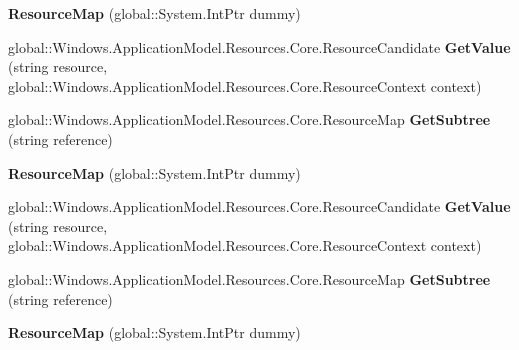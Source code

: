 \begin{DoxyCompactItemize}
{\bfseries Resource\+Map} (global\+::\+System.\+Int\+Ptr dummy)
\item 
\mbox{\label{class_windows_1_1_application_model_1_1_resources_1_1_core_1_1_resource_map_aef94042cd27f045f8035733034f6e2c4}} 
global\+::\+Windows.\+Application\+Model.\+Resources.\+Core.\+Resource\+Candidate {\bfseries Get\+Value} (string resource, global\+::\+Windows.\+Application\+Model.\+Resources.\+Core.\+Resource\+Context context)
\item 
\mbox{\label{class_windows_1_1_application_model_1_1_resources_1_1_core_1_1_resource_map_ac129a8e320a6dc314ec3767626950aa8}} 
global\+::\+Windows.\+Application\+Model.\+Resources.\+Core.\+Resource\+Map {\bfseries Get\+Subtree} (string reference)
\item 
\mbox{\label{class_windows_1_1_application_model_1_1_resources_1_1_core_1_1_resource_map_af0aec2b4469c89c900f7eed2f53504bf}} 
{\bfseries Resource\+Map} (global\+::\+System.\+Int\+Ptr dummy)
\item 
\mbox{\label{class_windows_1_1_application_model_1_1_resources_1_1_core_1_1_resource_map_aef94042cd27f045f8035733034f6e2c4}} 
global\+::\+Windows.\+Application\+Model.\+Resources.\+Core.\+Resource\+Candidate {\bfseries Get\+Value} (string resource, global\+::\+Windows.\+Application\+Model.\+Resources.\+Core.\+Resource\+Context context)
\item 
\mbox{\label{class_windows_1_1_application_model_1_1_resources_1_1_core_1_1_resource_map_ac129a8e320a6dc314ec3767626950aa8}} 
global\+::\+Windows.\+Application\+Model.\+Resources.\+Core.\+Resource\+Map {\bfseries Get\+Subtree} (string reference)
\item 
\mbox{\label{class_windows_1_1_application_model_1_1_resources_1_1_core_1_1_resource_map_af0aec2b4469c89c900f7eed2f53504bf}} 
{\bfseries Resource\+Map} (global\+::\+System.\+Int\+Ptr dummy)

\end{DoxyCompactItemize}
